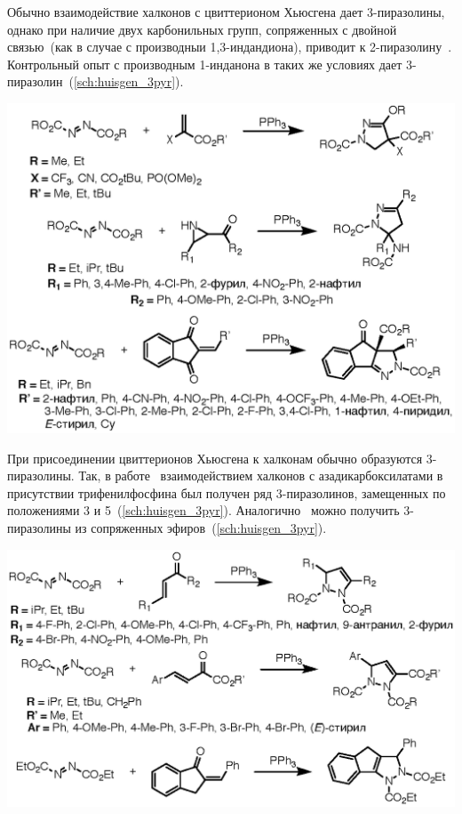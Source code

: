 Обычно взаимодействие халконов с цвиттерионом Хьюсгена дает 3-пиразолины, однако при наличие двух карбонильных групп, сопряженных с двойной связью~(как в случае с производныи 1,3-индандиона), приводит к 2-пиразолину~\cite{Li2017a}.
Контрольный опыт с производным 1-инданона в таких же условиях дает 3-пиразолин~(\ref{sch:huisgen_3pyr}).

\begin{scheme}[h!]
    \centering
    \includegraphics{sections/literature/img/huisgen_2pyr.eps}
    \caption{}
    \label{sch:huisgen_2pyr}
\end{scheme}

При присоединении цвиттерионов Хьюсгена к халконам обычно образуются 3-пиразолины.
Так, в работе~\cite{Nair2007} взаимодействием халконов с азадикарбоксилатами в присутствии трифенилфосфина был получен ряд 3-пиразолинов, замещенных по положениями 3 и 5~(\ref{sch:huisgen_3pyr}).
Аналогично~\cite{Zhang2018} можно получить 3-пиразолины из сопряженных эфиров~(\ref{sch:huisgen_3pyr}).

\begin{scheme}[h!]
    \centering
    \includegraphics{sections/literature/img/huisgen_3pyr.eps}
    \caption{}
    \label{sch:huisgen_3pyr}
\end{scheme}

